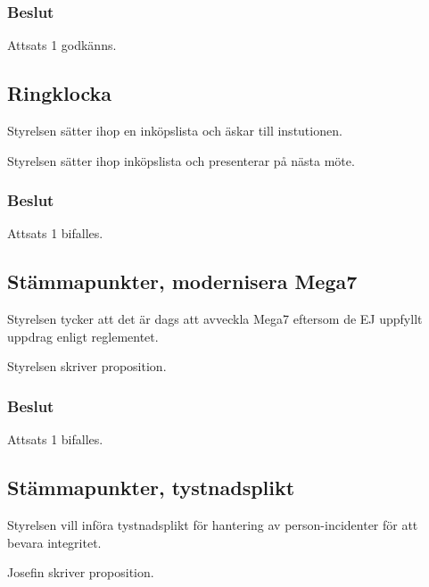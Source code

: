 \documentclass[protokoll]{dvd}
\begin{document}
\subsubsection{Beslut}
\begin{attsatser}
    \item Attsats 1 godkänns.
\end{attsatser}

\subsection{Ringklocka}
Styrelsen sätter ihop en inköpslista och äskar till instutionen.
\begin{attsatser}
    \item Styrelsen sätter ihop inköpslista och presenterar på nästa möte.
\end{attsatser}
\subsubsection{Beslut} 
\begin{attsatser}     
\item Attsats 1 bifalles. 
\end{attsatser}

\subsection{Stämmapunkter, modernisera Mega7}
Styrelsen tycker att det är dags att avveckla Mega7 eftersom de EJ uppfyllt uppdrag enligt reglementet.
\begin{attsatser}
    \item Styrelsen skriver proposition.
\end{attsatser}
\subsubsection{Beslut} 
\begin{attsatser}     
\item Attsats 1 bifalles. 
\end{attsatser}

\subsection{Stämmapunkter, tystnadsplikt}
Styrelsen vill införa tystnadsplikt för hantering av person-incidenter för att bevara integritet.
\begin{attsatser}
    \item Josefin skriver proposition.
\end{attsatser}
\end{document}
